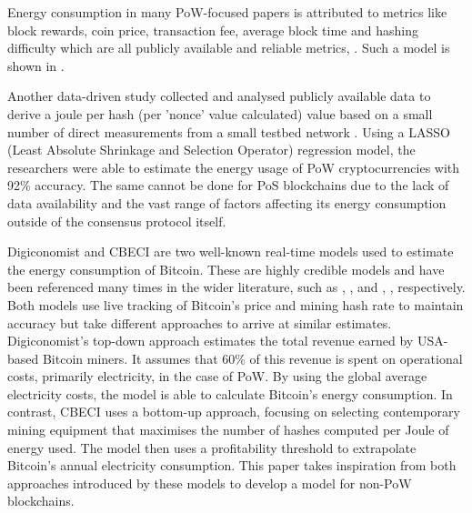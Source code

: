 Energy consumption in many PoW-focused papers is attributed to metrics like block rewards, coin price, transaction fee, average block time and hashing difficulty which are all publicly available and reliable metrics, \cite{Mcdonald2022EthereumEstimate}. Such a model is shown in .

Another data-driven study collected and analysed publicly available data to derive a joule per hash (per 'nonce' value calculated) value based on a small number of direct measurements from a small testbed network \cite{Cole2018ModelingAlgorithms}. Using a LASSO (Least Absolute Shrinkage and Selection Operator) regression model, the researchers were able to estimate the energy usage of PoW cryptocurrencies with 92\% accuracy. The same cannot be done for PoS blockchains due to the lack of data availability and the vast range of factors affecting its energy consumption outside of the consensus protocol itself.

Digiconomist \cite{BitcoinDigiconomist} and CBECI \cite{CambridgeCBECI} are two well-known real-time models used to estimate the energy consumption of Bitcoin. These are highly credible models and have been referenced many times in the wider literature, such as \cite{Cole2018ModelingAlgorithms}, \cite{Lei2021BestRecommendations}, and \cite{Erdogan2022AnalyzingSustainability}, \cite{Platt2022TheProof-of-Work}, respectively. Both models use live tracking of Bitcoin's price and mining hash rate to maintain accuracy but take different approaches to arrive at similar estimates. Digiconomist's top-down approach estimates the total revenue earned by USA-based Bitcoin miners. It assumes that 60\% of this revenue is spent on operational costs, primarily electricity, in the case of PoW. By using the global average electricity costs, the model is able to calculate Bitcoin's energy consumption. In contrast, CBECI uses a bottom-up approach, focusing on selecting contemporary mining equipment that maximises the number of hashes computed per Joule of energy used. The model then uses a profitability threshold to extrapolate Bitcoin's annual electricity consumption. This paper takes inspiration from both approaches introduced by these models to develop a model for non-PoW blockchains.







